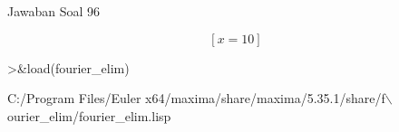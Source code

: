 \documentclass[a4paper,10pt]{article}
\begin{document}
\begin{eulernotebook}
\begin{euleroutput}
  Jawaban Soal 96
\end{euleroutput}
\begin{eulerformula}
\[
\left[ x=10 \right] 
\]
\end{eulerformula}
\begin{eulercomment}
\end{eulercomment}
\begin{eulerprompt}
>&load(fourier_elim)
\end{eulerprompt}
\begin{euleroutput}
  
          C:/Program Files/Euler x64/maxima/share/maxima/5.35.1/share/f\(\backslash\)
  ourier_elim/fourier_elim.lisp
  

\end{euleroutput}
\end{eulernotebook}
\end{document}
